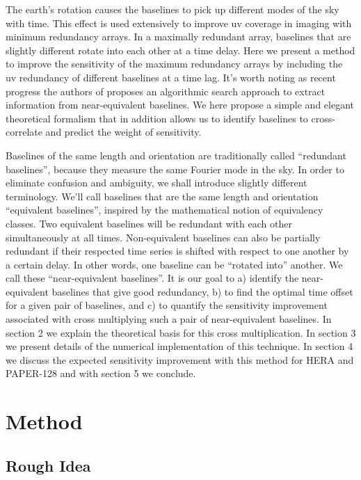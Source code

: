 \documentclass[preprint2,numberedappendix,tighten,twocolappendix]{aastex6}  %
\renewcommand\[{\begin{equation}}
\renewcommand\]{\end{equation}}
\begin{document}
The earth's rotation causes the baselines to pick up different modes of the sky with time. 
This effect is used extensively to improve uv coverage in imaging with minimum redundancy arrays. In
a maximally redundant array, baselines that are slightly different
rotate into each other at a time delay. Here we present a method to
improve the sensitivity of the maximum redundancy arrays by including
the uv redundancy of different baselines at a time lag. It's worth noting 
as recent progress the authors of \cite{wterm} proposes an algorithmic search approach to extract information from near-equivalent baselines. We here propose a simple and elegant theoretical formalism that in addition allows us to identify baselines to cross-correlate and predict the weight of sensitivity. 

Baselines of the same length and orientation are traditionally called
``redundant baselines'', because they measure the same Fourier mode
in the sky. In order to eliminate confusion and ambiguity, we shall
introduce slightly different terminology. We'll call baselines that
are the same length and orientation ``equivalent baselines'', inspired
by the mathematical notion of equivalency classes. Two equivalent
baselines will be redundant with each other simultaneously at all
times. Non-equivalent baselines can also be partially redundant if their
respected time series is shifted with respect to one another by a
certain delay. In other words, one baseline can be ``rotated into''
another. We call these ``near-equivalent baselines''. It is our
goal to a) identify the near-equivalent baselines that give good
redundancy, b) to find the optimal time offset for a given pair of baselines, and
c) to quantify the sensitivity improvement associated with cross multiplying
such a pair of near-equivalent baselines. In section
2 we explain the theoretical basis for this cross multiplication.
In section 3 we present details of the numerical implementation of
this technique. In section 4 we discuss the expected sensitivity improvement
with this method for HERA and PAPER-128 and with section 5 we conclude. 


\section{Method}

\subsection{Rough Idea}
\end{document}
